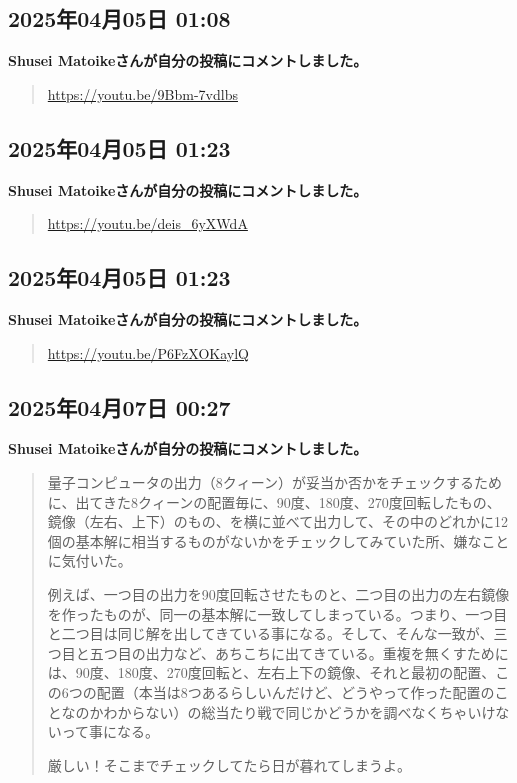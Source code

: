 \subsection*{2025年04月05日 01:08}

\textbf{Shusei Matoikeさんが自分の投稿にコメントしました。}

\begin{quote}
\url{https://youtu.be/9Bbm-7vdlbs}
\end{quote}

\subsection*{2025年04月05日 01:23}

\textbf{Shusei Matoikeさんが自分の投稿にコメントしました。}

\begin{quote}
\url{https://youtu.be/deis_6yXWdA}
\end{quote}

\subsection*{2025年04月05日 01:23}

\textbf{Shusei Matoikeさんが自分の投稿にコメントしました。}

\begin{quote}
\url{https://youtu.be/P6FzXOKaylQ}
\end{quote}

\subsection*{2025年04月07日 00:27}

\textbf{Shusei Matoikeさんが自分の投稿にコメントしました。}

\begin{quote}
量子コンピュータの出力（8クィーン）が妥当か否かをチェックするために、出てきた8クィーンの配置毎に、90度、180度、270度回転したもの、鏡像（左右、上下）のもの、を横に並べて出力して、その中のどれかに12個の基本解に相当するものがないかをチェックしてみていた所、嫌なことに気付いた。

例えば、一つ目の出力を90度回転させたものと、二つ目の出力の左右鏡像を作ったものが、同一の基本解に一致してしまっている。つまり、一つ目と二つ目は同じ解を出してきている事になる。そして、そんな一致が、三つ目と五つ目の出力など、あちこちに出てきている。重複を無くすためには、90度、180度、270度回転と、左右上下の鏡像、それと最初の配置、この6つの配置（本当は8つあるらしいんだけど、どうやって作った配置のことなのかわからない）の総当たり戦で同じかどうかを調べなくちゃいけないって事になる。

厳しい！そこまでチェックしてたら日が暮れてしまうよ。
\end{quote}

